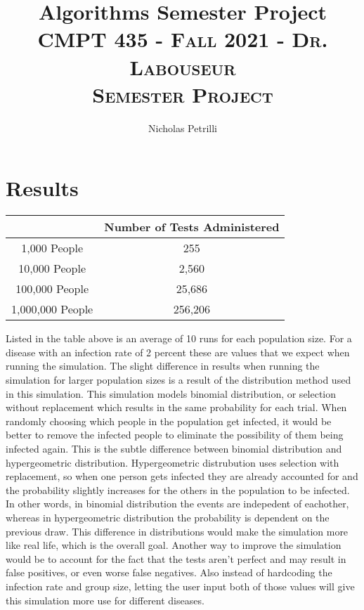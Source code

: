 \documentclass{article}
\title{Algorithms Semester Project}
\author{Nicholas Petrilli}
\title{	
   \normalfont \normalsize 
   \textsc{CMPT 435 - Fall 2021 - Dr. Labouseur} \\[10pt] %
   \textsc{Semester Project}
}
\begin{document}
\lstset{
  numbers=left,
  firstnumber=1,
  numberfirstline=true
}
\maketitle


\section{Results}
\begin{center}
\begin{tabular}{||c c||} 
 \hline
  & Number of Tests Administered  \\ [0.5ex] 
 \hline\hline
 1,000 People & 255 \\ 
 \hline
 10,000 People & 2,560 \\
 \hline
 100,000 People & 25,686 \\
 \hline
 1,000,000 People & 256,206 \\ [1ex]
 \hline
\end{tabular}
\end{center}

\noindent Listed in the table above is an average of 10 runs for each population size. For a disease with an infection rate of 2 percent these are values that we expect when running the simulation. The slight difference in results when running the simulation for larger population sizes is a result of the distribution method used in this simulation. This simulation models binomial distribution, or selection without replacement which results in the same probability for each trial. When randomly choosing which people in the population get infected, it would be better to remove the infected people to eliminate the possibility of them being infected again. This is the subtle difference between binomial distribution and hypergeometric distribution. Hypergeometric distrubution uses selection with replacement, so when one person gets infected they are already accounted for and the probability slightly increases for the others in the population to be infected. In other words, in binomial distribution the events are indepedent of eachother, whereas in hypergeometric distribution the probability is dependent on the previous draw. This difference in distributions would make the simulation more like real life, which is the overall goal. Another way to improve the simulation would be to account for the fact that the tests aren't perfect and may result in false positives, or even worse false negatives. Also instead of hardcoding the infection rate and group size, letting the user input both of those values will give this simulation more use for different diseases.
\end{document}
